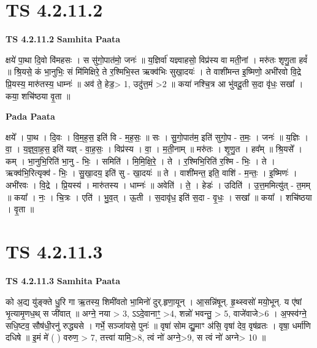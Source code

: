 \documentclass[17pt]{extarticle}
\begin{document}

\section{ TS 4.2.11.2 }

\textbf{TS 4.2.11.2 } \newline
\textbf{Samhita Paata} \newline

क्षये॑ पा॒था दि॒वो वि॑महसः । स सु॑गो॒पात॑मो॒ जनः॑ ॥ य॒ज्ञिर्वा॑ यज्ञ्वाहसो॒ विप्र॑स्य वा मती॒नां । मरु॑तः शृणु॒ता हवं᳚ ॥ श्रि॒यसे॒ कं भा॒नुभिः॒ सं मि॑मिक्षिरे॒ ते र॒श्मिभि॒स्त ऋक्व॑भिः सुखा॒दयः॑ । ते वाशी॑मन्त इ॒ष्मिणो॒ अभी॑रवो वि॒द्रे प्रि॒यस्य॒ मारु॑तस्य॒ धाम्नः॑ ॥ अव॑ ते॒ हेड॒> 1, उदु॑त्त॒मं >2 ॥ कया॑ नश्चि॒त्र आ भु॑वदू॒ती स॒दा वृ॑धः॒ सखा᳚ । कया॒ शचि॑ष्ठया वृ॒ता ॥ \newline

\textbf{Pada Paata} \newline

क्षये᳚ । पा॒थ । दि॒वः । वि॒म॒ह॒स॒ इति॑ वि - म॒ह॒सः॒ ॥ सः । सु॒गो॒पात॑म॒ इति॑ सुगो॒प - त॒मः॒ । जनः॑ ॥ य॒ज्ञिः । वा॒ । य॒ज्ञ्॒वा॒ह॒स॒ इति॑ यज्ञ् - वा॒ह॒सः॒ । विप्र॑स्य । वा॒ । म॒ती॒नाम् ॥ मरु॑तः । शृ॒णु॒त । हव᳚म् ॥ श्रि॒यसे᳚ । कम् । भा॒नुभि॒रिति॑ भा॒नु - भिः॒ । समिति॑ । मि॒मि॒क्षि॒रे॒ । ते । र॒श्मिभि॒रिति॑ र॒श्मि - भिः॒ । ते । ऋक्व॑भि॒रित्यृक्व॑ - भिः॒ । सु॒खा॒दय॒ इति॑ सु - खा॒दयः॑ ॥ ते । वाशी॑मन्त॒ इति॒ वाशि॑ - म॒न्तः॒ । इ॒ष्मिणः॑ । अभी॑रवः । वि॒द्रे । प्रि॒यस्य॑ । मारु॑तस्य । धाम्नः॑ ॥ अवेति॑ । ते॒ । हेडः॑ । उदिति॑ । उ॒त्त॒ममित्यु॑त् - त॒मम् ॥ कया᳚ । नः॒ । चि॒त्रः । एति॑ । भु॒व॒त् । ऊ॒ती । स॒दावृ॑ध॒ इति॑ स॒दा - वृ॒धः॒ । सखा᳚ ॥ कया᳚ । शचि॑ष्ठया । वृ॒ता ॥  \newline





\section{ TS 4.2.11.3 }

\textbf{TS 4.2.11.3 } \newline
\textbf{Samhita Paata} \newline

को अ॒द्य यु॑ङ्क्ते धु॒रि गा ऋ॒तस्य॒ शिमी॑वतो भा॒मिनो॑ दुर्.हृणा॒यून् । आ॒सन्नि॑षून्. हृ॒थ्स्वसो॑ मयो॒भून्. य ए॑षां भृ॒त्यामृ॒णध॒थ् स जी॑वात् ॥ अग्ने॒ नया > 3, ऽऽदे॒वानाꣳ॒॒ >4, शन्नो॑ भवन्तु॒ > 5, वाजे॑वाजे>6 । अ॒फ्स्व॑ग्ने॒ सधि॒ष्टव॒ सौष॑धी॒रनु॑ रुद्ध्यसे । गर्भे॒ सञ्जा॑यसे॒ पुनः॑ ॥ वृषा॑ सोम द्यु॒माꣳ अ॑सि॒ वृषा॑ देव॒ वृष॑व्रतः । वृषा॒ धर्मा॑णि दधिषे ॥ इ॒मं मे॑ ( ) वरुण॒ > 7, तत्त्वा॑ यामि॒>8, त्वं नो॑ अग्ने॒>9, स त्वं नो॑ अग्ने> 10 ॥ \newline
\end{document}
